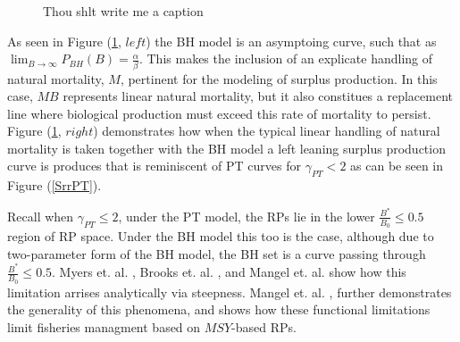 \begin{figure}[h!]
\begin{minipage}[h!]{0.49\textwidth}
\end{minipage}
\caption{\label{srrBH}
	\color{red} Thou shlt write me a caption
}
\end{figure}

%
As seen in Figure (\ref{srrBH}, $left$) the BH model is an asymptoing curve, 
such that as $\lim_{B\to\infty}P_{BH}(B)=\frac{\alpha}{\beta}$. This makes the 
inclusion of an explicate handling of natural mortality, $M$, pertinent for 
the modeling of surplus production. In this case, $MB$ represents linear natural 
mortality, but it also constitues a replacement line where biological production 
must exceed this rate of mortality to persist. Figure (\ref{srrBH}, $right$) 
demonstrates how when the typical linear handling of natural mortality is 
taken together with the BH model a left leaning surplus production curve is 
produces that is reminiscent of PT curves for $\gamma_{PT}<2$ as can be seen in 
Figure (\ref{SrrPT}).
  

%
Recall when $\gamma_{PT}\le2$, under the PT model, the RPs lie in the lower 
$\frac{B^*}{B_0}\le0.5$ region of RP space. Under the BH model this too is the case, 
although due to two-parameter form of the BH model, the BH set is a curve passing 
through $\frac{B^*}{B_0}\le0.5$. Myers et. al. \cite{myers_maximum_1999}, 
Brooks et. al. \cite{brooks_analytical_2010}, and Mangel et. al. \cite{mangel_perspective_2013} 
show how this limitation arrises analytically via steepness. Mangel et. al. \cite{mangel_perspective_2013}, 
further demonstrates the generality of this phenomena, and shows how these 
functional limitations limit fisheries managment based on $MSY$-based RPs. 

